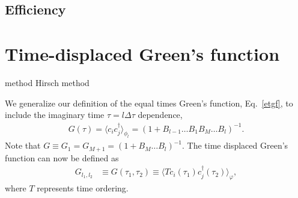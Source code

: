 \documentclass[%
 reprint,
superscriptaddress,
citeautoscript,
showpacs,
 amsmath,amssymb,
 aps,
 prb,
longbibliography,
]{revtex4-1}
\begin{document}
\subsection{Efficiency}



\section{Time-displaced Green's function}
\citet{Loh2005} method
Hirsch method\cite{Hirsch1988}

We generalize our definition of the equal times Green's function, Eq.~\ref{etgf}, to include the imaginary time $\tau = l \Delta \tau$ dependence,
\begin{align}
G(\tau) = \langle c_{i} c_{j}^\dagger \rangle_{\phi_l} = \left( 1 + B_{l-1}\dots B_1 B_M \dots B_l \right)^{-1}.
\end{align}
Note that $ G \equiv G_1 = G_{M+1} = \left( 1 + B_M \dots B_l \right)^{-1} $. The time displaced Green's function can now be defined as\cite{Santos2003, Assaad2002a}
\begin{align*}
	G_{l_1,l_2} &\equiv G(\tau_1, \tau_2) \equiv \langle T c_i(\tau_1) c_j^\dagger(\tau_2) \rangle_\varphi,
\end{align*}
where $T$ represents time ordering.
\end{document}
